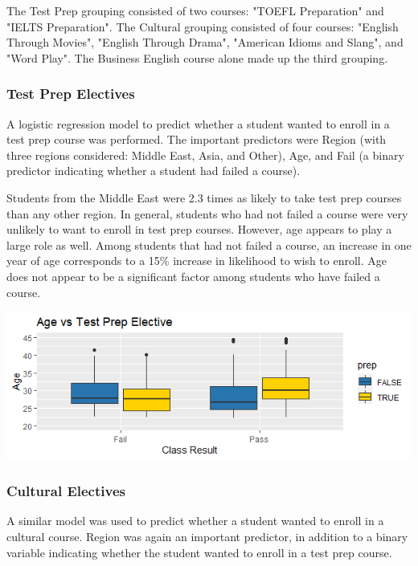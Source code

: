 \documentclass[12pt,letterpaper]{article}
\begin{document}
The Test Prep grouping consisted of two courses: "TOEFL Preparation" and "IELTS Preparation". The Cultural grouping consisted of four courses: "English Through Movies", "English Through Drama", "American Idioms and Slang", and "Word Play". The Business English course alone made up the third grouping.

\subsubsection{Test Prep Electives}

A logistic regression model to predict whether a student wanted to enroll in a test prep course was performed. The important predictors were Region (with three regions considered: Middle East, Asia, and Other), Age, and Fail (a binary predictor indicating whether a student had failed a course).

Students from the Middle East were 2.3 times as likely to take test prep courses than any other region. In general, students who had not failed a course were very unlikely to want to enroll in test prep courses. However, age appears to play a large role as well. Among students that had not failed a course, an increase in one year of age corresponds to a 15\% increase in likelihood to wish to enroll. Age does not appear to be a significant factor among students who have failed a course.

\begin{center}
    \includegraphics[width = \textwidth]{Plots/age_test_prep.png}
\end{center}

\subsubsection{Cultural Electives}

A similar model was used to predict whether a student wanted to enroll in a cultural course. Region was again an important predictor, in addition to a binary variable indicating whether the student wanted to enroll in a test prep course.
\end{document}
